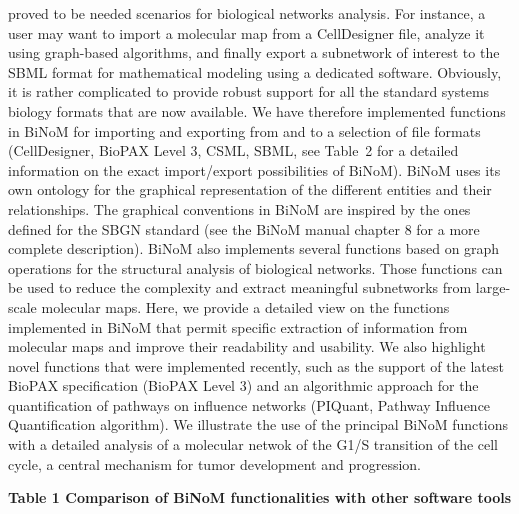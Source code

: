 \documentclass[11pt]{bmc_article_s50}
\newenvironment{bmcformat}{\begin{raggedright}\baselineskip20pt\sloppy\setboolean{publ}{false}}{\end{raggedright}\baselineskip20pt\sloppy}
\begin{document}
\begin{bmcformat}
proved to be needed scenarios for biological networks analysis. For instance, a user may want
to import a molecular map from a CellDesigner file, analyze it using graph-based
algorithms, and finally export a subnetwork of interest to the SBML format for
mathematical modeling using a dedicated software. Obviously, it is rather
complicated to provide robust support for all the standard systems biology
formats that are now available. We have therefore implemented functions in BiNoM
for importing and exporting from and to a selection of file formats
(CellDesigner, BioPAX Level 3, CSML, SBML, see Table~2 for a detailed
information on the exact import/export possibilities of BiNoM). BiNoM uses its
own ontology for the graphical representation of the different entities and
their relationships. The graphical conventions in BiNoM are inspired by the ones defined for the SBGN standard
(see the BiNoM manual chapter 8 for a more complete description).
BiNoM also implements several functions based on graph operations for the structural analysis of
biological networks. Those functions can be used to reduce the complexity and
extract meaningful subnetworks from large-scale molecular maps. Here, we provide
a detailed view on the functions implemented in BiNoM
that permit specific extraction of information from molecular maps
and improve their readability and usability. We also highlight novel functions
that were implemented recently, such as the support of the latest BioPAX
specification (BioPAX Level 3) and an algorithmic approach for the
quantification of pathways on influence networks (PIQuant, Pathway Influence Quantification algorithm). We illustrate the
use of the principal BiNoM functions with a detailed analysis of a molecular
netwok of the G1/S transition of the cell cycle, a central mechanism
for tumor development and progression.

\begin{sidewaystable}
  \textbf{Table 1 Comparison of BiNoM functionalities with other software tools}
\footnotesize

\hspace*{-15pt} \begin{tabular}{lccccccccccccc}


\end{tabular}
\end{sidewaystable}
\end{bmcformat}
\end{document}
